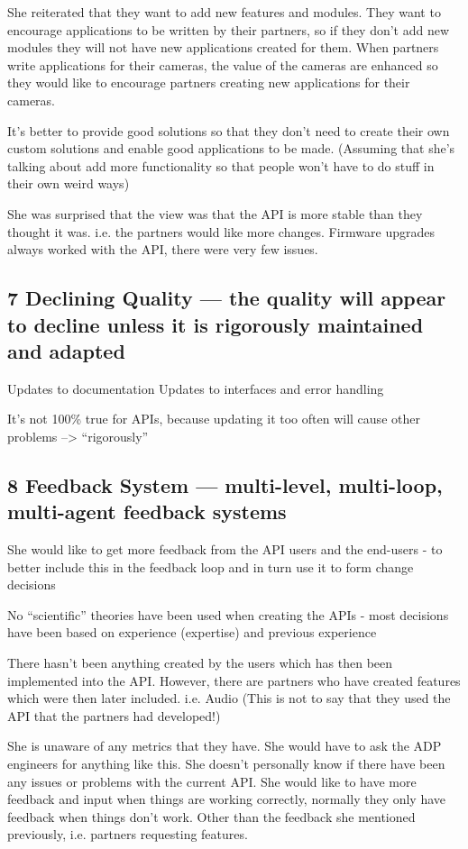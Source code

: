 \documentclass[conference]{IEEEtran}
\begin{document}
She reiterated that they want to add new features and modules. They want to encourage applications to be written by their partners, so if they don’t add new modules they will not have new applications created for them. When partners write applications for their cameras, the value of the cameras are enhanced so they would like to encourage partners creating new applications for their cameras.

It’s better to provide good solutions so that they don’t need to create their own custom solutions and enable good applications to be made. (Assuming that she's talking about add more functionality so that people won't have to do stuff in their own weird ways)

She was surprised that the view was that the API is more stable than they thought it was. i.e. the partners would like more changes. Firmware upgrades always worked with the API, there were very few issues.

\subsection{7 Declining Quality — the quality will appear to decline unless it is rigorously maintained and adapted}
Updates to documentation
Updates to interfaces and error handling

It's not 100\% true for APIs, because updating it too often will cause other problems --> ``rigorously''

\subsection{8 Feedback System — multi-level, multi-loop, multi-agent feedback systems}
She would like to get more feedback from the API users and the end-users - to better include this in the feedback loop and in turn use it to form change decisions

No “scientific” theories have been used when creating the APIs - most decisions have been based on experience (expertise) and previous experience

There hasn’t been anything created by the users which has then been implemented into the API. However, there are partners who have created features which were then later included. i.e. Audio (This is not to say that they used the API that the partners had developed!)



She is unaware of any metrics that they have. She would have to ask the ADP engineers for anything like this. She doesn’t personally know if there have been any issues or problems with the current API. She would like to have more feedback and input when things are working correctly, normally they only have feedback when things don’t work. Other than the feedback she mentioned previously, i.e. partners requesting features.
\end{document}
